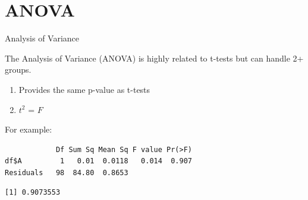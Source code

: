 \section{ANOVA}\label{anova}

\begin{frame}[fragile]{Analysis of Variance}

The Analysis of Variance (ANOVA) is highly related to t-tests but can
handle 2+ groups.

\begin{enumerate}
\def\labelenumi{\arabic{enumi}.}
\tightlist
\item
  Provides the same p-value as t-tests
\item
  \(t^2\) = \(F\)
\end{enumerate}

For example:

\begin{Shaded}
\begin{Highlighting}[]
\StringTok{ }\OperatorTok{$}\OperatorTok{~}\StringTok{ }\OperatorTok{$}
\end{Highlighting}
\end{Shaded}

\begin{verbatim}
            Df Sum Sq Mean Sq F value Pr(>F)
df$A         1   0.01  0.0118   0.014  0.907
Residuals   98  84.80  0.8653               
\end{verbatim}

\begin{Shaded}
\begin{Highlighting}[]
\OperatorTok{$}\OperatorTok{~}\StringTok{ }\OperatorTok{$}\OperatorTok{$}
\end{Highlighting}
\end{Shaded}

\begin{verbatim}
[1] 0.9073553
\end{verbatim}

\end{frame}

